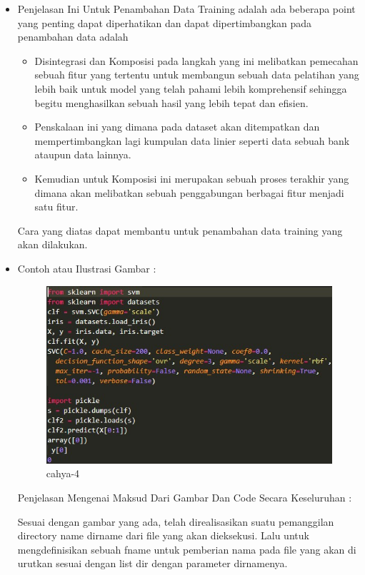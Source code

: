 \begin{itemize}
\item Penjelasan Ini Untuk Penambahan Data Training adalah  ada beberapa point yang  penting dapat diperhatikan dan dapat dipertimbangkan pada penambahan data adalah
\begin{itemize}
\item Disintegrasi dan Komposisi pada  langkah yang ini melibatkan pemecahan sebuah fitur yang tertentu untuk membangun sebuah data pelatihan yang lebih baik untuk model yang telah pahami lebih komprehensif sehingga begitu menghasilkan sebuah hasil yang lebih tepat dan efisien.
\item Penskalaan ini yang dimana pada dataset akan ditempatkan dan mempertimbangkan lagi kumpulan data linier seperti data sebuah bank ataupun data lainnya.
\item Kemudian untuk Komposisi ini  merupakan sebuah proses terakhir yang dimana akan melibatkan sebuah penggabungan berbagai fitur menjadi satu fitur.
\par
\end{itemize}
\par Cara yang  diatas dapat membantu untuk penambahan data training yang akan dilakukan.
\par
\par
\item Contoh atau Ilustrasi Gambar :
\par
\begin{figure}[!hbtp]
\centering
\includegraphics[scale=0.3]{figures/cahya4.png}
\caption{cahya-4}
\label{cahya-4}
\end{figure}
\par
\par Penjelasan Mengenai  Maksud Dari Gambar Dan Code Secara Keseluruhan  : 
\par Sesuai dengan gambar yang ada, telah direalisasikan suatu pemanggilan directory name dirname dari file yang akan dieksekusi. Lalu untuk mengdefinisikan sebuah fname untuk pemberian nama pada file  yang akan di urutkan sesuai dengan list dir dengan parameter dirnamenya.
\par
\end{itemize}

